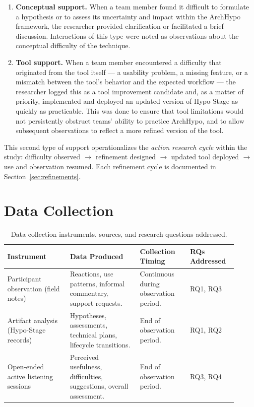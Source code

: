 \begin{enumerate}
  \item \textbf{Conceptual support.} When a team member found it difficult to
    formulate a hypothesis or to assess its uncertainty and impact within the
    ArchHypo framework, the researcher provided clarification or facilitated a brief
    discussion. Interactions of this type were noted as observations about the
    conceptual difficulty of the technique.

  \item \textbf{Tool support.} When a team member encountered a difficulty that
    originated from the tool itself --- a usability problem, a missing feature, or a
    mismatch between the tool's behavior and the expected workflow --- the researcher
    logged this as a tool improvement candidate and, as a matter of priority,
    implemented and deployed an updated version of Hypo-Stage as quickly as
    practicable. This was done to ensure that tool limitations would not persistently
    obstruct teams' ability to practice ArchHypo, and to allow subsequent
    observations to reflect a more refined version of the tool.
\end{enumerate}

This second type of support operationalizes the \emph{action research cycle} within
the study: difficulty observed $\rightarrow$ refinement designed $\rightarrow$
updated tool deployed $\rightarrow$ use and observation resumed. Each refinement
cycle is documented in Section~\ref{sec:refinements}.

\section{Data Collection}
\label{sec:data-collection}

\begin{table}[htbp]
\centering
\caption{Data collection instruments, sources, and research questions addressed.}
\label{tab:data-collection}
\begin{tabular}{p{0.25\linewidth} p{0.28\linewidth} p{0.20\linewidth} p{0.19\linewidth}}
\toprule
\textbf{Instrument} & \textbf{Data Produced} & \textbf{Collection Timing} & \textbf{RQs Addressed} \\
\midrule
Participant observation (field notes) & Reactions, use patterns, informal commentary, support requests. & Continuous during observation period. & RQ1, RQ3 \\
\midrule
Artifact analysis (Hypo-Stage records) & Hypotheses, assessments, technical plans, lifecycle transitions. & End of observation period. & RQ1, RQ2 \\
\midrule
Open-ended active listening sessions & Perceived usefulness, difficulties, suggestions, overall assessment. & End of observation period. & RQ3, RQ4 \\
\bottomrule
\end{tabular}
\end{table}

